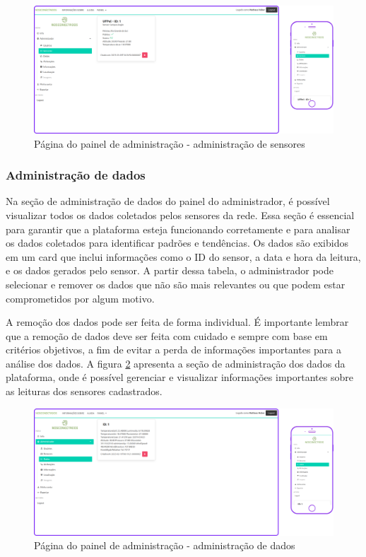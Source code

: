 \documentclass[tcc,capa]{texufpel}
\begin{document}
\begin{figure}[htbp]
  \centering \includegraphics[scale=.2]{assets/painelsensores.png}
  \caption{Página do painel de administração - administração de sensores}
  \label{adminsensores}
\end{figure}
\newpage
\subsubsection{Administração de dados}
Na seção de administração de dados do painel do administrador, é possível visualizar todos os dados coletados pelos sensores da rede. Essa seção é essencial para garantir que a plataforma esteja funcionando corretamente e para analisar os dados coletados para identificar padrões e tendências. Os dados são exibidos em um card que inclui informações como o ID do sensor, a data e hora da leitura, e os dados gerados pelo sensor. A partir dessa tabela, o administrador pode selecionar e remover os dados que não são mais relevantes ou que podem estar comprometidos por algum motivo.

A remoção dos dados pode ser feita de forma individual. É importante lembrar que a remoção de dados deve ser feita com cuidado e sempre com base em critérios objetivos, a fim de evitar a perda de informações importantes para a análise dos dados. A figura \ref{admindados} apresenta a seção de administração dos dados da plataforma, onde é possível gerenciar e visualizar informações importantes sobre as leituras dos sensores cadastrados.

\begin{figure}[htbp]
  \centering \includegraphics[scale=.2]{assets/paineldados.png}
  \caption{Página do painel de administração - administração de dados}
  \label{admindados}
\end{figure}
\newpage
\end{document}
